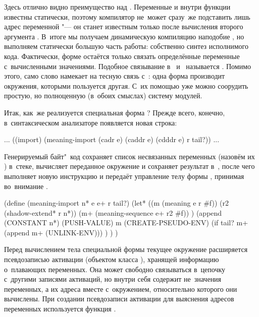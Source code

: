 Здесь отлично видно преимущество  над . Переменные
 и  внутри функции известны статически, поэтому компилятор
не~может сразу~же подставить лишь адрес переменной  "--- он станет
известным только после вычисления второго аргумента . В~итоге мы
получаем динамическую компиляцию наподобие , но выполняем статически
большую часть работы: собственно синтез исполнимого кода. Фактически, форме
 остаётся только связать определённые переменные с~вычисленными
значениями. Подобное связывание в~\cite{lf93} и~\cite{nq89} называется
. Помимо этого, само слово  намекает на
тесную связь с~: одна форма производит окружения, которыми
пользуется другая. С~их помощью уже можно соорудить простую, но полноценную
(в~обоих смыслах) систему модулей.

Итак, как~же реализуется специальная форма ? Прежде всего,
конечно, в~синтаксическом анализаторе  появляется новая строка:

\begin{code:lisp}
...
((import) (meaning-import (cadr e) (caddr e) (cdddr e) r tail?)) ...
\end{code:lisp}

Генерируемый байт"~код сохраняет список несвязанных переменных (назовём их
) в~стеке, вычисляет переданное окружение и сохраняет результат
в~, после чего выполняет новую инструкцию  и
передаёт управление телу формы , принимая во~внимание .

\begin{code:lisp}
(define (meaning-import n* e e+ r tail?)
  (let* ((m (meaning e r #f))
         (r2 (shadow-extend* r n*))
         (m+ (meaning-sequence e+ r2 #f)) )
    (append (CONSTANT n*) (PUSH-VALUE)
            m (CREATE-PSEUDO-ENV)
            (if tail? m+ (append m+ (UNLINK-ENV))) ) ) )
\end{code:lisp}

Перед вычислением тела специальной формы  текущее окружение
расширяется псевдозаписью активации (объектом класса
), хранящей информацию о~плавающих переменных.
Она может свободно связываться в~цепочку с~другими записями активаций, но внутри
себя содержит не~значения переменных, а их адреса вместе с~окружением,
относительно которого они вычислены. При создании псевдозаписи активации для
выяснения адресов переменных используется функция .

